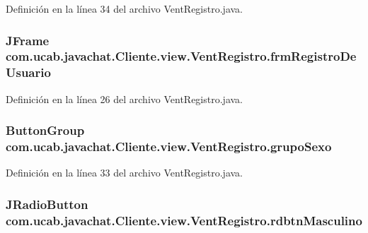 Definición en la línea 34 del archivo Vent\-Registro.\-java.

\hypertarget{classcom_1_1ucab_1_1javachat_1_1_cliente_1_1view_1_1_vent_registro_ac619d27c8f647974c7aa2b32f2c27a49}{
\subsubsection[{frm\-Registro\-De\-Usuario}]{\setlength{\rightskip}{0pt plus 5cm}J\-Frame com.\-ucab.\-javachat.\-Cliente.\-view.\-Vent\-Registro.\-frm\-Registro\-De\-Usuario}}\label{classcom_1_1ucab_1_1javachat_1_1_cliente_1_1view_1_1_vent_registro_ac619d27c8f647974c7aa2b32f2c27a49}


Definición en la línea 26 del archivo Vent\-Registro.\-java.

\hypertarget{classcom_1_1ucab_1_1javachat_1_1_cliente_1_1view_1_1_vent_registro_af45d621f85c701f30e64605ab02e1393}{
\subsubsection[{grupo\-Sexo}]{\setlength{\rightskip}{0pt plus 5cm}Button\-Group com.\-ucab.\-javachat.\-Cliente.\-view.\-Vent\-Registro.\-grupo\-Sexo}}\label{classcom_1_1ucab_1_1javachat_1_1_cliente_1_1view_1_1_vent_registro_af45d621f85c701f30e64605ab02e1393}


Definición en la línea 33 del archivo Vent\-Registro.\-java.

\hypertarget{classcom_1_1ucab_1_1javachat_1_1_cliente_1_1view_1_1_vent_registro_a7348a156becf753abdf2a1ccdf2c02a4}{
\subsubsection[{rdbtn\-Masculino}]{\setlength{\rightskip}{0pt plus 5cm}J\-Radio\-Button com.\-ucab.\-javachat.\-Cliente.\-view.\-Vent\-Registro.\-rdbtn\-Masculino}}\label{classcom_1_1ucab_1_1javachat_1_1_cliente_1_1view_1_1_vent_registro_a7348a156becf753abdf2a1ccdf2c02a4}


